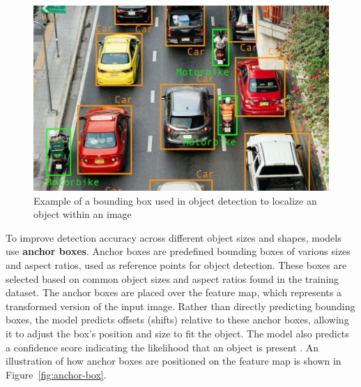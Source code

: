 \begin{figure}[h!]
    \centering
    \includegraphics[width=0.75\linewidth]{figures/theory/image-recognition/bbox-example.png}
    \caption[Bounding box in object detection]{Example of a bounding box used in object detection to localize an object within an image \cite{peopleforai:boundingbox}}
    \label{fig:boundingbox}
\end{figure}

To improve detection accuracy across different object sizes and shapes, models use \textbf{anchor boxes}. Anchor boxes are predefined bounding boxes of various sizes and aspect ratios, used as reference points for object detection. These boxes are selected based on common object sizes and aspect ratios found in the training dataset. The anchor boxes are placed over the feature map, which represents a transformed version of the input image. Rather than directly predicting bounding boxes, the model predicts offsets (shifts) relative to these anchor boxes, allowing it to adjust the box's position and size to fit the object. The model also predicts a confidence score indicating the likelihood that an object is present \cite{thinkautonomous:anchorboxes}. An illustration of how anchor boxes are positioned on the feature map is shown in Figure~\ref{fig:anchor-box}.

\newpage

